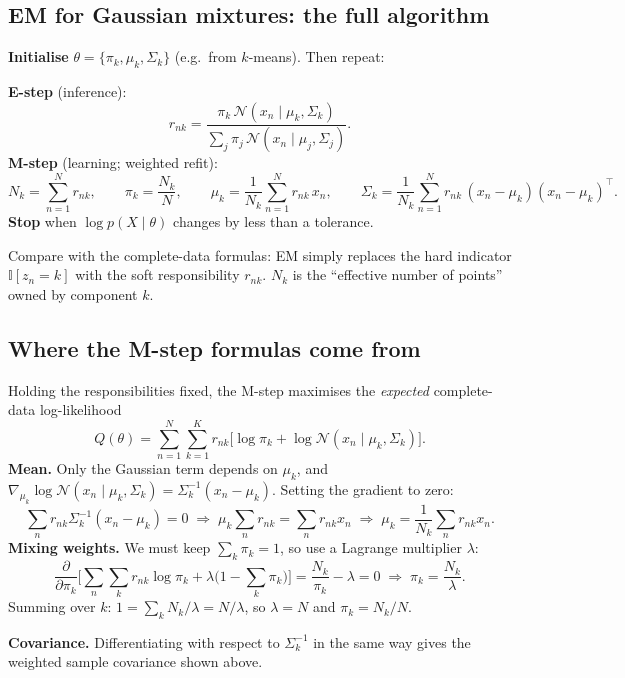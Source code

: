 \documentclass[11pt,a4paper]{article}
\newcommand{\N}{\mathcal{N}}
\newcommand{\Ind}{\mathbb{I}}
\begin{document}
\subsection{EM for Gaussian mixtures: the full algorithm}

\textbf{Initialise} $\theta=\{\pi_k,\mu_k,\Sigma_k\}$ (e.g.\ from $k$-means). Then repeat:

\textbf{E-step} (inference):
\[
r_{nk}=\frac{\pi_k\,\N(x_n\mid\mu_k,\Sigma_k)}{\sum_j\pi_j\,\N(x_n\mid\mu_j,\Sigma_j)}.
\]
\textbf{M-step} (learning; weighted refit):
\[
N_k=\sum_{n=1}^N r_{nk},\qquad
\pi_k=\frac{N_k}{N},\qquad
\mu_k=\frac{1}{N_k}\sum_{n=1}^N r_{nk}\,x_n,\qquad
\Sigma_k=\frac{1}{N_k}\sum_{n=1}^N r_{nk}\,(x_n-\mu_k)(x_n-\mu_k)^\top .
\]
\textbf{Stop} when $\log p(X\mid\theta)$ changes by less than a tolerance.

Compare with the complete-data formulas: EM simply replaces the hard indicator $\Ind[z_n=k]$ with the soft responsibility $r_{nk}$. $N_k$ is the ``effective number of points'' owned by component $k$.

\subsection{Where the M-step formulas come from}

Holding the responsibilities fixed, the M-step maximises the \emph{expected} complete-data log-likelihood
\[
Q(\theta)=\sum_{n=1}^N\sum_{k=1}^K r_{nk}\big[\log\pi_k+\log\N(x_n\mid\mu_k,\Sigma_k)\big].
\]
\textbf{Mean.} Only the Gaussian term depends on $\mu_k$, and $\nabla_{\mu_k}\log\N(x_n\mid\mu_k,\Sigma_k)=\Sigma_k^{-1}(x_n-\mu_k)$. Setting the gradient to zero:
\[
\sum_n r_{nk}\Sigma_k^{-1}(x_n-\mu_k)=0\;\Longrightarrow\;\mu_k\sum_n r_{nk}=\sum_n r_{nk}x_n\;\Longrightarrow\;\mu_k=\frac{1}{N_k}\sum_n r_{nk}x_n.
\]
\textbf{Mixing weights.} We must keep $\sum_k\pi_k=1$, so use a Lagrange multiplier $\lambda$:
\[
\frac{\partial}{\partial\pi_k}\Big[\sum_n\sum_k r_{nk}\log\pi_k+\lambda\big(1-\textstyle\sum_k\pi_k\big)\Big]=\frac{N_k}{\pi_k}-\lambda=0\;\Rightarrow\;\pi_k=\frac{N_k}{\lambda}.
\]
Summing over $k$: $1=\sum_kN_k/\lambda=N/\lambda$, so $\lambda=N$ and $\pi_k=N_k/N$.

\textbf{Covariance.} Differentiating with respect to $\Sigma_k^{-1}$ in the same way gives the weighted sample covariance shown above.
\end{document}
